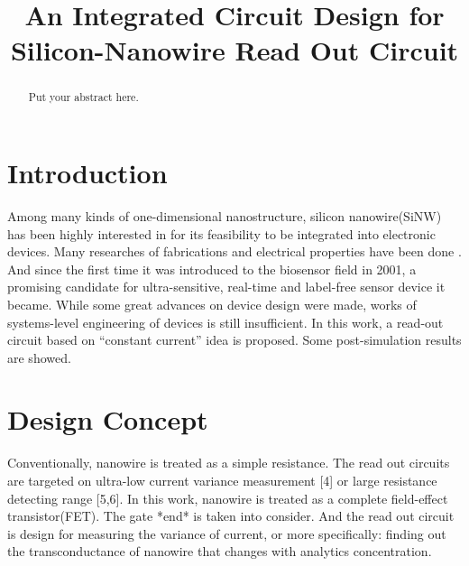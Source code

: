 \documentclass{article}
\title{An Integrated Circuit Design for Silicon-Nanowire Read Out Circuit}
\begin{document}
%
\maketitle
%
\begin{abstract}
Put your abstract here.

\end{abstract}
%
\section{Introduction}
\label{sec:intro}

Among many kinds of one-dimensional nanostructure, silicon nanowire(SiNW) has been highly interested in for its feasibility to be integrated into electronic devices.
Many researches of fabrications and electrical properties have been done \cite{J1}.
And since the first time it was introduced to the biosensor field in 2001\cite{J2}, a promising candidate for ultra-sensitive, real-time and label-free  sensor device it became.
While some great advances on device design were made\cite{J3}, works of systems-level engineering of devices is still insufficient.
In this work, a read-out circuit based on “constant current” idea is proposed.
Some post-simulation results are showed.



\section{Design Concept}
\label{sec:rules}

Conventionally, nanowire is treated as a simple resistance.
The read out circuits are targeted on ultra-low current variance measurement [4] or large resistance detecting range [5,6].
In this work, nanowire is treated as a complete field-effect transistor(FET).
The gate *end* is taken into consider.
And the read out circuit is design for measuring the variance of current, or more specifically: finding out the transconductance of nanowire that changes with analytics concentration.





%
%
%
%
\end{document}
